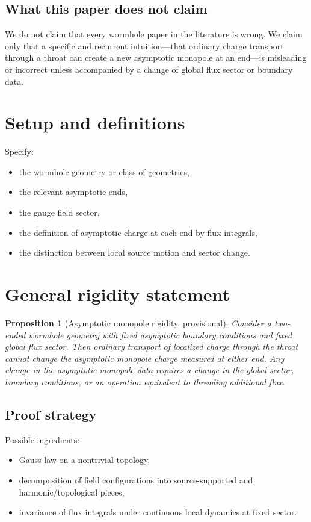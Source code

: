 \documentclass[11pt]{article}
\newtheorem{proposition}{Proposition}
\begin{document}
\subsection*{What this paper does not claim}
We do not claim that every wormhole paper in the literature is wrong. We claim only that a specific and recurrent intuition---that ordinary charge transport through a throat can create a new asymptotic monopole at an end---is misleading or incorrect unless accompanied by a change of global flux sector or boundary data.

\section{Setup and definitions}

Specify:
\begin{itemize}
    \item the wormhole geometry or class of geometries,
    \item the relevant asymptotic ends,
    \item the gauge field sector,
    \item the definition of asymptotic charge at each end by flux integrals,
    \item the distinction between local source motion and sector change.
\end{itemize}

\section{General rigidity statement}

\begin{proposition}[Asymptotic monopole rigidity, provisional]
Consider a two-ended wormhole geometry with fixed asymptotic boundary conditions and fixed global flux sector. Then ordinary transport of localized charge through the throat cannot change the asymptotic monopole charge measured at either end. Any change in the asymptotic monopole data requires a change in the global sector, boundary conditions, or an operation equivalent to threading additional flux.
\end{proposition}

\subsection*{Proof strategy}
Possible ingredients:
\begin{itemize}
    \item Gauss law on a nontrivial topology,
    \item decomposition of field configurations into source-supported and harmonic/topological pieces,
    \item invariance of flux integrals under continuous local dynamics at fixed sector.
\end{itemize}
\end{document}
